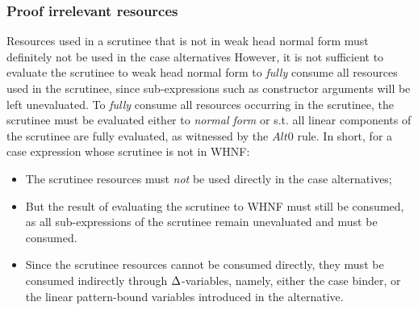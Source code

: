 \documentclass[acmsmall,review]{acmart}
\begin{document}


\subsubsection{Proof irrelevant resources}


Resources used in a scrutinee that is not in weak head normal form must
definitely not be used in the case alternatives
%
However, it is not sufficient to evaluate the scrutinee to weak head normal
form to \emph{fully} consume all resources used in the scrutinee, since
sub-expressions such as constructor arguments will be left unevaluated. To
\emph{fully} consume all resources occurring in the scrutinee, the scrutinee
must be evaluated either to \emph{normal form} or s.t. all linear components of
the scrutinee are fully evaluated, as witnessed by the $Alt0$ rule. In short,
for a case expression whose scrutinee is not in WHNF:
\begin{itemize}

\item The scrutinee resources must \emph{not} be used directly in the case alternatives;
\item But the result of evaluating the scrutinee to WHNF must still be
consumed, as all sub-expressions of the scrutinee remain unevaluated and must
be consumed.
\item Since the scrutinee resources cannot be consumed directly, they must be
consumed indirectly through $\Delta$-variables, namely, either the case binder, or
the linear pattern-bound variables introduced in the alternative.

\end{itemize}
\end{document}
